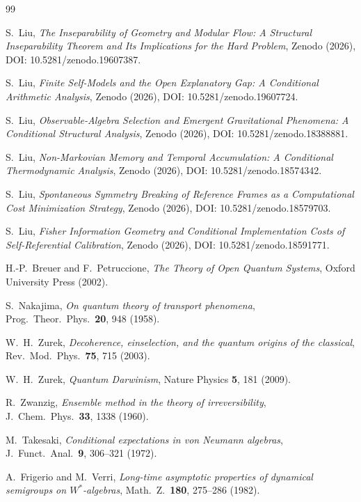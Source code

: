 \documentclass[12pt]{article}
\theoremstyle{definition}
\theoremstyle{remark}
\begin{document}
\newpage
{}

\begin{thebibliography}{99}

S.~Liu, \emph{The Inseparability of Geometry and Modular Flow: A Structural Inseparability Theorem and Its Implications for the Hard Problem}, Zenodo (2026), DOI: 10.5281/zenodo.19607387.

S.~Liu, \emph{Finite Self-Models and the Open Explanatory Gap: A Conditional Arithmetic Analysis}, Zenodo (2026), DOI: 10.5281/zenodo.19607724.

S.~Liu, \emph{Observable-Algebra Selection and Emergent Gravitational Phenomena: A Conditional Structural Analysis}, Zenodo (2026), DOI: 10.5281/zenodo.18388881.

S.~Liu, \emph{Non-Markovian Memory and Temporal Accumulation: A Conditional Thermodynamic Analysis}, Zenodo (2026), DOI: 10.5281/zenodo.18574342.

S.~Liu, \emph{Spontaneous Symmetry Breaking of Reference Frames as a Computational Cost Minimization Strategy}, Zenodo (2026), DOI: 10.5281/zenodo.18579703.

S.~Liu, \emph{Fisher Information Geometry and Conditional Implementation Costs of Self-Referential Calibration}, Zenodo (2026), DOI: 10.5281/zenodo.18591771.

H.-P.~Breuer and F.~Petruccione,
\emph{The Theory of Open Quantum Systems},
Oxford University Press (2002).

S.~Nakajima,
\emph{On quantum theory of transport phenomena},
Prog.\ Theor.\ Phys.\ \textbf{20}, 948 (1958).

W.~H.~Zurek,
\emph{Decoherence, einselection, and the quantum origins of the classical},
Rev.\ Mod.\ Phys.\ \textbf{75}, 715 (2003).

W.~H.~Zurek,
\emph{Quantum Darwinism},
Nature Physics \textbf{5}, 181 (2009).

R.~Zwanzig,
\emph{Ensemble method in the theory of irreversibility},
J.\ Chem.\ Phys.\ \textbf{33}, 1338 (1960).

M.~Takesaki,
\emph{Conditional expectations in von Neumann algebras},
J.\ Funct.\ Anal.\ \textbf{9}, 306--321 (1972).

A.~Frigerio and M.~Verri,
\emph{Long-time asymptotic properties of dynamical semigroups on $W^*$-algebras},
Math.\ Z.\ \textbf{180}, 275--286 (1982).

\end{thebibliography}
 
\end{document}
